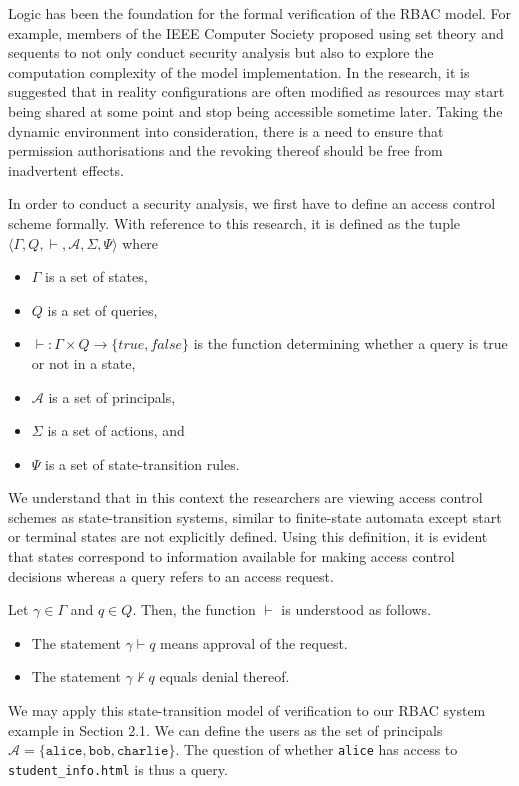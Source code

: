 \documentclass{article}
\begin{document}
Logic has been the foundation for the formal verification of the RBAC
model. For example, members of the IEEE Computer Society proposed using
set theory and sequents to not only conduct security analysis but also
to explore the computation complexity of the model implementation. In the
research, it is suggested that in reality configurations are often modified
as resources may start being shared at some point and stop being accessible
sometime later.\cite{formal-verification} Taking the dynamic environment into
consideration, there is a need to ensure that permission authorisations and
the revoking thereof should be free from inadvertent effects.

In order to conduct a security analysis, we first have to define an
access control scheme formally. With reference to this research, it is
defined as the tuple $\langle \Gamma, Q, \vdash, \mathcal{A}, \Sigma, \Psi
\rangle$\cite{formal-verification} where \begin{itemize}
    \item $\Gamma$ is a set of states, \item $Q$ is a set of queries,
    \item $\vdash: \Gamma \times Q \to \{ \textit{true}, \textit{false} \}$
    is the function determining whether a query is true or not in a state,
    \item $\mathcal{A}$ is a set of principals, \item $\Sigma$ is a set of
    actions, and \item $\Psi$ is a set of state-transition rules.
\end{itemize}

We understand that in this context the researchers are viewing access control
schemes as state-transition systems, similar to finite-state automata except
start or terminal states are not explicitly defined. Using this definition,
it is evident that states correspond to information available for making
access control decisions whereas a query refers to an access request.

Let $\gamma \in \Gamma$ and $q \in Q$. Then, the function $\vdash$ is
understood as follows.  \begin{itemize}
    \item The statement $\gamma \vdash q$ means approval of the request.
    \item The statement $\gamma \nvdash q$ equals denial thereof.
\end{itemize}

We may apply this state-transition model of verification to our RBAC system
example in Section 2.1. We can define the users as the set of principals
$\mathcal{A} = \{ \texttt{alice}, \texttt{bob}, \texttt{charlie} \}$. The
question of whether \texttt{alice} has access to \texttt{student\_info.html}
is thus a query.
\end{document}
